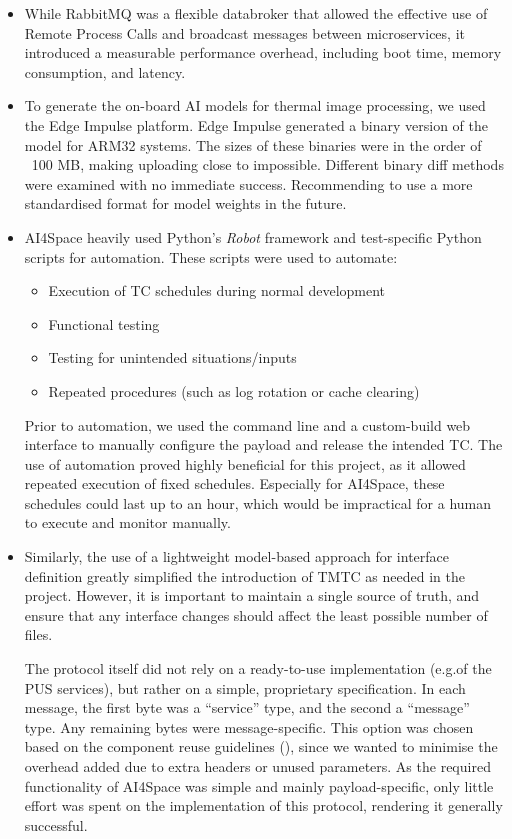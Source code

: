 \documentclass[a4paper,nobib,justified,final]{tufte-book}
\begin{document}
\begin{itemize}[itemsep=-1ex]
\item While RabbitMQ was a flexible databroker that allowed the effective use of Remote Process Calls and broadcast messages between microservices, it introduced a measurable performance overhead, including boot time, memory consumption, and latency.


\item To generate the on-board \acs{AI} models for thermal image processing, we used the Edge Impulse platform. Edge Impulse generated a binary version of the model for ARM32 systems. The sizes of these binaries were in the order of ~100 MB, making uploading close to impossible. Different binary diff methods were examined with no immediate success. Recommending to use a more standardised format for model weights in the future.

\item AI4Space heavily used Python's \emph{Robot} framework and test-specific Python scripts for automation. These scripts were used to automate:
\begin{itemize}[itemsep=-3ex]
	\item Execution of \acs{TC} schedules during normal development
	\item Functional testing
	\item Testing for unintended situations/inputs
	\item Repeated procedures (such as log rotation or cache clearing)
\end{itemize}
Prior to automation, we used the command line and a custom-build web interface to manually configure the payload and release the intended \acs{TC}.
The use of automation proved highly beneficial for this project, as it allowed repeated execution of fixed schedules. Especially for AI4Space, these schedules could last up to an hour, which would be impractical for a human to execute and monitor manually.

\item Similarly, the use of a lightweight model-based approach for interface definition greatly simplified the introduction of \acs{TMTC} as needed in the project. However, it is important to maintain a single source of truth, and ensure that any interface changes should affect the least possible number of files. 

The protocol itself did not rely on a ready-to-use implementation (e.g.\@ of the \acs{PUS} services), but rather on a simple, proprietary specification. In each message, the first byte was a ``service'' type, and the second a ``message'' type. Any remaining bytes were message-specific. This option was chosen based on the component reuse guidelines (), since we wanted to minimise the overhead added due to extra headers or unused parameters. As the required functionality of AI4Space was simple and mainly payload-specific, only little effort was spent on the implementation of this protocol, rendering it generally successful.


\end{itemize}
\end{document}
